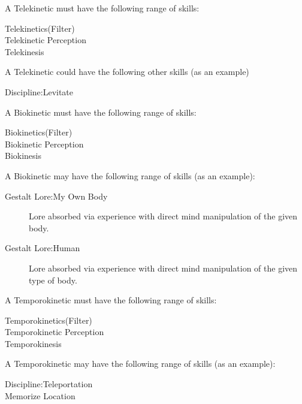 \documentclass{book}
\begin{document}
A Telekinetic must have the following range of skills:

\begin{description}
    \item[Telekinetics(Filter)]
    \item[Telekinetic Perception]
    \item[Telekinesis]
\end{description}

A Telekinetic could have the following other skills (as an example)

\begin{description}
    \item[Discipline:Levitate]
\end{description}

A Biokinetic must have the following range of skills:

\begin{description}
    \item[Biokinetics(Filter)]
    \item[Biokinetic Perception]
    \item[Biokinesis]
\end{description}

A Biokinetic may have the following range of skills (as an example):

\begin{description}
    \item[Gestalt Lore:My Own Body]
    Lore absorbed via experience with direct mind manipulation of the
    given body.
    \item[Gestalt Lore:Human]
    Lore absorbed via experience with direct mind manipulation of the
    given type of body.
\end{description}

A Temporokinetic must have the following range of skills:

\begin{description}
    \item[Temporokinetics(Filter)]
    \item[Temporokinetic Perception]
    \item[Temporokinesis]
\end{description}

A Temporokinetic may have the following range of skills (as an example):

\begin{description}
    \item[Discipline:Teleportation]
    \item[Memorize Location]
\end{description}
\end{document}
